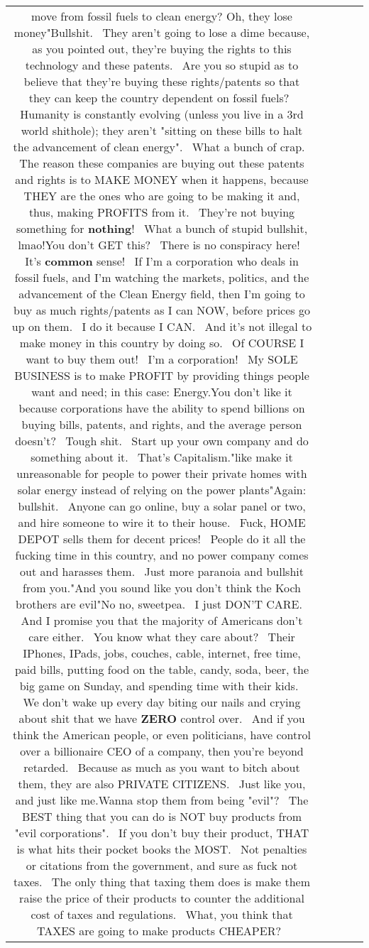 \documentclass[11pt]{article}
\newlength\mylength
\begin{document}
\begin{center}
\begin{longtable}{|C{.65\mylength}|C{.30\mylength}|C{.12\mylength}|C{.12\mylength}|C{.12\mylength}|}
move from fossil fuels to clean energy? Oh, they lose money"Bullshit.  They aren't going to lose a dime because, as you pointed out, they're buying the rights to this technology and these patents.  Are you so stupid as to believe that they're buying these rights/patents so that they can keep the country dependent on fossil fuels?  Humanity is constantly evolving (unless you live in a 3rd world shithole); they aren't "sitting on these bills to halt the advancement of clean energy".  What a bunch of crap.  The reason these companies are buying out these patents and rights is to MAKE MONEY when it happens, because THEY are the ones who are going to be making it and, thus, making PROFITS from it.  They're not buying something for \textbf{nothing}!  What a bunch of stupid bullshit, lmao!You don't GET this?  There is no conspiracy here!  It's \textbf{common} sense!  If I'm a corporation who deals in fossil fuels, and I'm watching the markets, politics, and the advancement of the Clean Energy field, then I'm going to buy as much rights/patents as I can NOW, before prices go up on them.  I do it because I CAN.  And it's not illegal to make money in this country by doing so.  Of COURSE I want to buy them out!  I'm a corporation!  My SOLE BUSINESS is to make PROFIT by providing things people want and need; in this case: Energy.You don't like it because corporations have the ability to spend billions on buying bills, patents, and rights, and the average person doesn't?  Tough shit.  Start up your own company and do something about it.  That's Capitalism."like make it unreasonable for people to power their private homes with solar energy instead of relying on the power plants"Again: bullshit.  Anyone can go online, buy a solar panel or two, and hire someone to wire it to their house.  Fuck, HOME DEPOT sells them for decent prices!  People do it all the fucking time in this country, and no power company comes out and harasses them.  Just more paranoia and bullshit from you."And you sound like you don't think the Koch brothers are evil"No no, sweetpea.  I just DON'T CARE.  And I promise you that the majority of Americans don't care either.  You know what they care about?  Their IPhones, IPads, jobs, couches, cable, internet, free time, paid bills, putting food on the table, candy, soda, beer, the big game on Sunday, and spending time with their kids.  We don't wake up every day biting our nails and crying about shit that we have \textbf{ZERO} control over.  And if you think the American people, or even politicians, have control over a billionaire CEO of a company, then you're beyond retarded.  Because as much as you want to bitch about them, they are also PRIVATE CITIZENS.  Just like you, and just like me.Wanna stop them from being "evil"?  The BEST thing that you can do is NOT buy products from "evil corporations".  If you don't buy their product, THAT is what hits their pocket books the MOST.  Not penalties or citations from the government, and sure as fuck not taxes.  The only thing that taxing them does is make them raise the price of their products to counter the additional cost of taxes and regulations.  What, you think that TAXES are going to make products CHEAPER?  
\end{longtable}
\end{center}
\end{document}
